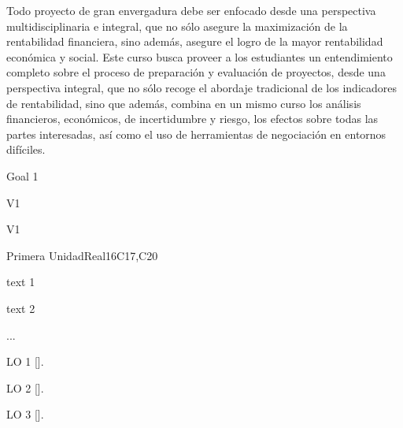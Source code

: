 \begin{syllabus}


\begin{justification}
Todo proyecto de gran envergadura debe ser enfocado desde una perspectiva multidisciplinaria e integral, que no sólo asegure la maximización de la rentabilidad financiera, sino además, asegure el logro de la mayor rentabilidad económica y social. Este curso busca proveer a los estudiantes  un entendimiento completo sobre el proceso de preparación y evaluación de proyectos, desde una perspectiva integral, que no sólo recoge el abordaje tradicional de los indicadores de rentabilidad, sino que además, combina en un mismo curso los análisis financieros, económicos, de incertidumbre y riesgo, los efectos sobre todas las partes interesadas, así como el uso de herramientas de negociación en entornos difíciles.
\end{justification}

\begin{goals}
\item Goal 1
\end{goals}

\begin{outcomes}{V1}
   \item {}
   \item {}
   \item {}
\end{outcomes}

\begin{competences}{V1}
    \item {}
    \item {}
    \item {}
\end{competences}

\begin{unit}{}{Primera Unidad}{Real}{16}{C17,C20}
\begin{topics}
      \item text 1
      \item text 2
      \item ...
\end{topics}

\begin{learningoutcomes}
   \item LO 1 [\Usage].
   \item LO 2 [\Usage].
   \item LO 3 [\Usage].
\end{learningoutcomes}
\end{unit}

\begin{coursebibliography}
\end{coursebibliography}

\end{syllabus}

